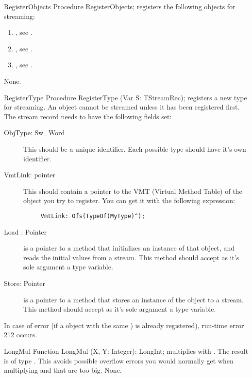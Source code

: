 \begin{procedure}{RegisterObjects}
\Declaration
Procedure RegisterObjects;
\Description
{} registers the following objects for streaming:
\begin{enumerate}
\item {}, see .
\item {}, see .
\item {}, see .
\end{enumerate}
\Errors
None.
\SeeAlso
{}
\end{procedure}

\begin{procedure}{RegisterType}
\Declaration
Procedure RegisterType (Var S: TStreamRec);
\Description
{} registers a new type for streaming. An object cannot
be streamed unless it has been registered first. 
The stream record  needs to have the following fields set:

\begin{description}
\item[ObjType: Sw\_Word] This should be a unique identifier. Each possible
type should have it's own identifier. 
\item[VmtLink: pointer] This should contain a pointer to the VMT (Virtual
Method Table) of the object you try to register. You can get it with the
following expression:
\begin{verbatim}
     VmtLink: Ofs(TypeOf(MyType)^);
\end{verbatim}
\item[Load : Pointer] is a pointer to a method that initializes an instance
of that object, and reads the initial values from a stream. This method
should accept as it's sole argument a  type variable.
\item[Store: Pointer]is a pointer to a method that stores an instance of the
object to a stream. This method should accept as it's sole argument
 a  type variable.
\end{description}
\Errors
In case of error (if a object with the same ) is already
registered), run-time error 212 occurs.
\end{procedure}

\html{}

\begin{function}{LongMul}
\Declaration
Function LongMul (X, Y: Integer): LongInt;
\Description
{} multiplies  with . The result is of
type . This avoids possible overflow errors you would normally
get when multiplying  and  that are too big.
\Errors
None.
\SeeAlso
{}
\end{function}

